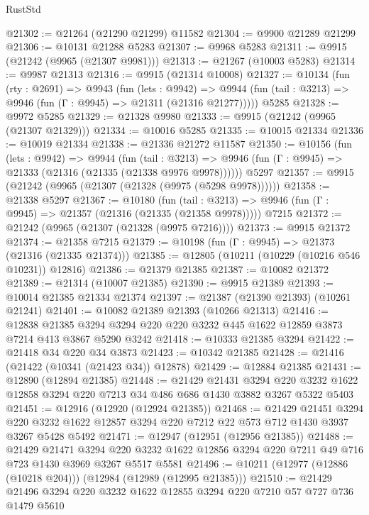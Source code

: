 \begin{lexlean}{RustStd}
\begin{coremodule}
{\begin{coremodule}
{{{{{{{{{{{{{{{{{{{{{{{{{@21302 := @21264 (@21290 @21299) @11582
@21304 := @9900 @21289 @21299
@21306 := @10131 @21288 @5283
@21307 := @9968 @5283
@21311 := @9915 (@21242 (@9965 (@21307 @9981)))
@21313 := @21267 (@10003 @5283)
@21314 := @9987 @21313
@21316 := @9915 (@21314 @10008)
@21327 := @10134
    (fun (rty : @2691) =>
    @9943
      (fun (lets : @9942) =>
      @9944 (fun (tail : @3213) => @9946 (fun (Γ : @9945) => @21311 (@21316 @21277)))))
    @5285
@21328 := @9972 @5285
@21329 := @21328 @9980
@21333 := @9915 (@21242 (@9965 (@21307 @21329)))
@21334 := @10016 @5285
@21335 := @10015 @21334
@21336 := @10019 @21334
@21338 := @21336 @21272 @11587
@21350 := @10156
    (fun (lets : @9942) =>
    @9944
      (fun (tail : @3213) =>
      @9946 (fun (Γ : @9945) => @21333 (@21316 (@21335 (@21338 @9976 @9978))))))
    @5297
@21357 := @9915 (@21242 (@9965 (@21307 (@21328 (@9975 (@5298 @9978))))))
@21358 := @21338 @5297
@21367 := @10180
    (fun (tail : @3213) => @9946 (fun (Γ : @9945) => @21357 (@21316 (@21335 (@21358 @9978)))))
    @7215
@21372 := @21242 (@9965 (@21307 (@21328 (@9975 @7216))))
@21373 := @9915 @21372
@21374 := @21358 @7215
@21379 := @10198 (fun (Γ : @9945) => @21373 (@21316 (@21335 @21374)))
@21385 := @12805 (@10211 (@10229 (@10216 @546 @10231)) @12816)
@21386 := @21379 @21385
@21387 := @10082 @21372
@21389 := @21314 (@10007 @21385)
@21390 := @9915 @21389
@21393 := @10014 @21385 @21334 @21374
@21397 := @21387 (@21390 @21393) (@10261 @21241)
@21401 := @10082 @21389 @21393 (@10266 @21313)
@21416 := @12838
    @21385
    @3294
    @3294
    @220
    @220
    @3232
    @445
    @1622
    @12859
    @3873
    @7214
    @413
    @3867
    @5290
    @3242
@21418 := @10333 @21385 @3294
@21422 := @21418 @34 @220 @34 @3873
@21423 := @10342 @21385
@21428 := @21416 (@21422 (@10341 (@21423 @34)) @12878)
@21429 := @12884 @21385
@21431 := @12890 (@12894 @21385)
@21448 := @21429
    @21431
    @3294
    @220
    @3232
    @1622
    @12858
    @3294
    @220
    @7213
    @34
    @486
    @686
    @1430
    @3882
    @3267
    @5322
    @5403
@21451 := @12916 (@12920 (@12924 @21385))
@21468 := @21429
    @21451
    @3294
    @220
    @3232
    @1622
    @12857
    @3294
    @220
    @7212
    @22
    @573
    @712
    @1430
    @3937
    @3267
    @5428
    @5492
@21471 := @12947 (@12951 (@12956 @21385))
@21488 := @21429
    @21471
    @3294
    @220
    @3232
    @1622
    @12856
    @3294
    @220
    @7211
    @49
    @716
    @723
    @1430
    @3969
    @3267
    @5517
    @5581
@21496 := @10211 (@12977 (@12886 (@10218 @204))) (@12984 (@12989 (@12995 @21385)))
@21510 := @21429 @21496 @3294 @220 @3232 @1622 @12855 @3294 @220 @7210 @57 @727 @736 @1479 @5610
}}}}}}}}}}}}}}}}}}}}}}}}}
\end{coremodule}}
\end{coremodule}
\end{lexlean}
